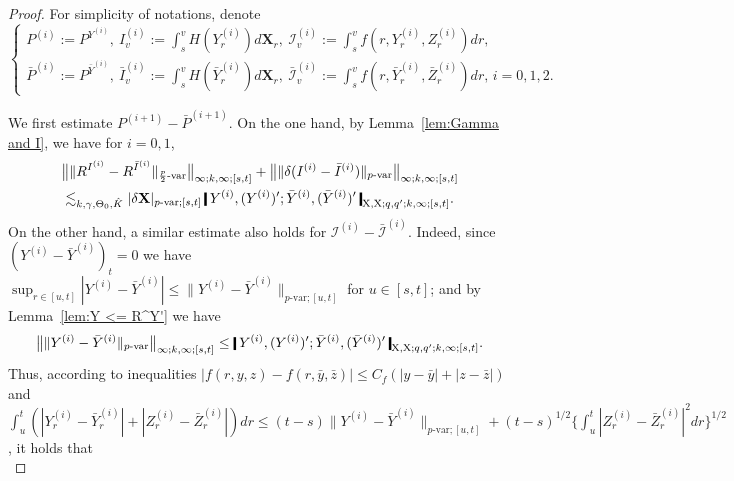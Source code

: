 \documentclass[11pt,reqno]{amsart}
\numberwithin{equation}{section}
\newcommand{\shortthickbar}{%
  \vcenter{\hbox{\rule{1.8pt}{2.2ex}}}%
}
\newcommand{\thicknm}[1]{%
  \mathopen{\shortthickbar}%
  \mkern4mu #1 \mkern4mu%
  \mathclose{\shortthickbar}%
}
\begin{document}
\begin{proof}
For simplicity of notations, denote 
\begin{equation*}
\begin{cases}\displaystyle
P^{(i)} := P^{Y^{(i)}},\ I^{(i)}_v := \int_s^v H(Y^{(i)}_r) d\mathbf X_r,\ \mathcal I^{(i)}_v := \int_{s}^v f(r, Y^{(i)}_r,  Z^{(i)}_r) dr, \\ \displaystyle
\bar P^{(i)} := P^{\bar Y^{(i)}},\ \bar I^{(i)}_v := \int_s^v H(\bar Y^{(i)}_r) d\mathbf X_r,\  \bar{\mathcal I}^{(i)}_v := \int_{s}^v f(r,\bar Y^{(i)}_r,\bar Z^{(i)}_r) dr, \, i = 0,1,2.
\end{cases}
\end{equation*}

We first estimate $P^{(i+1)} - \bar P^{(i+1)}$. On the one hand, by Lemma~\ref{lem:Gamma and I}, we have for $i = 0,1$, 
\begin{equation}\label{e:I - I* i}
\begin{aligned}
&\big\| \|R^{I^{(i)}} - R^{\bar  I^{(i)}}\|_{\frac{p}{2}\text{-}\mathrm{var}} \big\|_{\infty;k,\infty;[s,t]} + \big\| \|\delta (I^{(i)} - \bar  I^{(i)})\|_{p\text{-}\mathrm{var}} \big\|_{\infty;k,\infty;[s,t]}\\
&\lesssim_{k,\gamma,\Theta_0,\hat K} |\delta \mathbf X|_{p\text{-}\mathrm{var};[s,t]} \, \thicknm{Y^{(i)} ,(Y^{(i)})'; \bar Y^{(i)}, (\bar Y^{(i)})'}_{\mathrm X,\mathrm X;q,q';k,\infty;[s,t]}. 
\end{aligned}
\end{equation}
On the other hand, a similar estimate also holds for $\mathcal I^{(i)} - \bar{\mathcal I}^{(i)}$. Indeed, since $(Y^{(i)} - \bar Y^{(i)})_{t} = 0$ we have $\sup_{r \in [u,t]} |Y^{(i)} - \bar Y^{(i)}| \le \|Y^{(i)} - \bar Y^{(i)}\|_{p\text{-}\mathrm{var};[u,t]}$ for $u \in [s,t]$; and by Lemma~\ref{lem:Y <= R^Y'} we have 
\begin{equation*}
\big\| \|Y^{(i)} - \bar Y^{(i)}\|_{p\text{-}\mathrm{var}} \big\|_{\infty;k,\infty;[s,t]} \le \thicknm{Y^{(i)} ,(Y^{(i)})'; \bar Y^{(i)}, (\bar Y^{(i)})'}_{\mathrm X,\mathrm X;q,q';k,\infty;[s,t]}.
\end{equation*}	
Thus, according to inequalities $|f(r,y,z) - f(r,\bar y,\bar z)| \le C_f (|y - \bar y| + |z - \bar z|)$ and $\int_{u}^{t} (|Y^{(i)}_r - \bar Y^{(i)}_r| + |Z^{(i)}_r - \bar Z^{(i)}_r|) dr \le (t - s) \|Y^{(i)} - \bar Y^{(i)}\|_{p\text{-}\mathrm{var};[u,t]} + (t-s)^{1/2} \{\int_{u}^t |Z^{(i)}_r - \bar Z^{(i)}_r|^2 dr\}^{1/2}$, it holds that
\begin{equation}\label{e:Gamma-Gamma* i}

\end{equation}
\end{proof}
\end{document}
